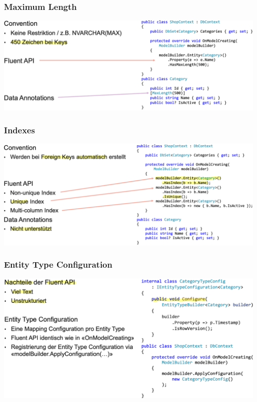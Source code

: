 \subsubsection{Maximum Length}
\begin{center}
    \includegraphics[scale=.37]{graphic/efc/Maximum Lengt.png}
\end{center}
\vspace{-8pt}

\subsubsection{Indexes}
\begin{center}
    \includegraphics[scale=.36]{graphic/efc/Indexes.png}
\end{center}
\vspace{-8pt}

\subsubsection{Entity Type Configuration}
\begin{center}
    \includegraphics[scale=.37]{graphic/efc/Entity Type Configuration.png}
\end{center}
\vspace{-8pt}


